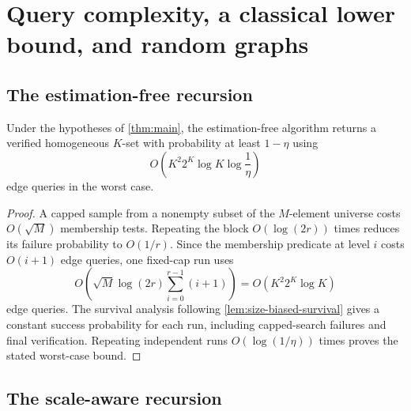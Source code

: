 \section{Query complexity, a classical lower bound, and random graphs}\label{sec:complexity}

\subsection{The estimation-free recursion}

\begin{proposition}
\label{prop:size-biased-algorithm}
Under the hypotheses of \cref{thm:main}, the estimation-free algorithm returns
a verified homogeneous $K$-set with probability at least $1-\eta$ using
\[
 O\!\left(K^2 2^K\log K\log\frac1\eta\right)
\]
edge queries in the worst case.
\end{proposition}

\begin{proof}
A capped sample from a nonempty subset of the $M$-element universe costs
$O(\sqrt M)$ membership tests.  Repeating the block $O(\log(2r))$ times
reduces its failure probability to $O(1/r)$.  Since the membership predicate
at level $i$ costs $O(i+1)$ edge queries, one fixed-cap run uses
\[
 O\!\left(\sqrt M\log(2r)\sum_{i=0}^{r-1}(i+1)\right)
 =O(K^2 2^K\log K)
\]
edge queries.  The survival analysis following
\cref{lem:size-biased-survival} gives a constant success probability for each
run, including capped-search failures and final verification.  Repeating
independent runs $O(\log(1/\eta))$ times proves the stated worst-case bound.
\end{proof}

\subsection{The scale-aware recursion}

